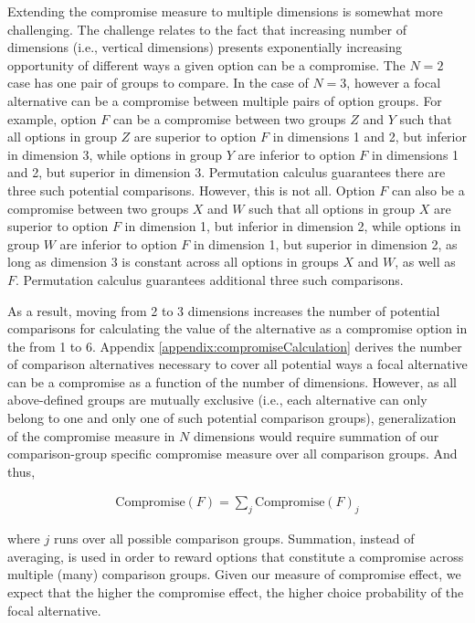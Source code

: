 \documentclass[a4paper,12pt]{article}
\begin{document}
Extending the compromise measure to multiple dimensions is somewhat more challenging. The challenge relates to the fact that increasing number of dimensions (i.e., vertical dimensions) presents exponentially increasing opportunity of different ways a given option can be a compromise. The $N = 2$ case has one pair of groups to compare. In the case of $N = 3$, however a focal alternative can be a compromise between multiple pairs of option groups. For example, option $F$ can be a compromise between two groups $Z$ and $Y$ such that all options in group $Z$ are superior to option $F$ in dimensions 1 and 2, but inferior in dimension 3, while options in group $Y$ are inferior to option $F$ in dimensions 1 and 2, but superior in dimension 3. Permutation calculus guarantees there are three such potential comparisons. However, this is not all. Option $F$ can also be a compromise between two groups $X$ and $W$ such that all options in group $X$ are superior to option $F$ in dimension 1, but inferior in dimension 2, while options in group $W$ are inferior to option $F$ in dimension 1, but superior in dimension 2, as long as dimension 3 is constant across all options in groups $X$ and $W$, as well as $F$. Permutation calculus guarantees additional three such comparisons.

As a result, moving from 2 to 3 dimensions increases the number of potential comparisons for calculating the value of the alternative as a compromise option in the from 1 to 6. Appendix \ref{appendix:compromiseCalculation} derives the number of comparison alternatives necessary to cover all potential ways a focal alternative can be a compromise as a function of the number of dimensions. However, as all above-defined groups are mutually exclusive (i.e., each alternative can only belong to one and only one of such potential comparison groups), generalization of the compromise measure in $N$ dimensions would require summation of our comparison-group specific compromise measure over all comparison groups. And thus,

\begin{align}\label{eq:compromiseEffectGeneralFormula}
    \text{Compromise}(F) = \sum_j \text{Compromise}(F)_j
\end{align}


 where $j$ runs over all possible comparison groups. Summation, instead of averaging, is used in order to reward options that constitute a compromise across multiple (many) comparison groups. Given our measure of compromise effect, we expect that the higher the compromise effect, the higher choice probability of the focal alternative.    
\end{document}
